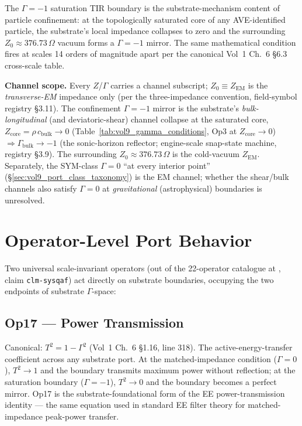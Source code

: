 The $\Gamma = -1$\gammaundeclared{} saturation TIR boundary is the substrate-mechanism content of particle confinement: at the topologically saturated core of any AVE-identified particle, the substrate's local impedance collapses to zero and the surrounding $Z_0 \approx 376.73\,\Omega$ vacuum forms a $\Gamma = -1$\gammaundeclared{} mirror. The same mathematical condition fires at scales 14 orders of magnitude apart per the canonical Vol~1 Ch.~6 \S 6.3 cross-scale table.

\noindent
\textbf{Channel scope.} Every $Z$/$\Gamma$ carries a channel subscript; $Z_0 \equiv Z_{\mathrm{EM}}$ is the \emph{transverse-EM} impedance only (per the three-impedance convention, field-symbol registry \S3.11). The confinement $\Gamma = -1$\gammaundeclared{} mirror is the substrate's \emph{bulk-longitudinal} (and deviatoric-shear) channel collapse at the saturated core, $Z_{\mathrm{core}} = \rho\,c_{\mathrm{bulk}} \to 0$ (Table~\ref{tab:vol9_gamma_conditions}, Op3 at $Z_{\mathrm{core}} \to 0$) $\Rightarrow \Gamma_{\mathrm{bulk}} \to -1$ (the sonic-horizon reflector; engine-scale snap-state machine, registry \S3.9). The surrounding $Z_0 \approx 376.73\,\Omega$ is the cold-vacuum $Z_{\mathrm{EM}}$. Separately, the SYM-class $\Gamma = 0$ ``at every interior point'' (\S\ref{sec:vol9_port_class_taxonomy}) is the EM channel; whether the shear/bulk channels also satisfy $\Gamma = 0$ at \emph{gravitational} (astrophysical) boundaries is unresolved.

\section{Operator-Level Port Behavior}
\label{sec:vol9_operator_port_behavior}

Two universal scale-invariant operators (out of the 22-operator catalogue at , claim \texttt{clm-sysqaf}) act directly on substrate boundaries, occupying the two endpoints of substrate $\Gamma$-space:

\subsection{Op17 --- Power Transmission}

Canonical: $T^2 = 1 - \Gamma^2$ (Vol~1 Ch.~6 \S 1.16, line 318). The active-energy-transfer coefficient across any substrate port. At the matched-impedance condition ($\Gamma = 0$), $T^2 \to 1$ and the boundary transmits maximum power without reflection; at the saturation boundary ($\Gamma = -1$\gammaundeclared{}), $T^2 \to 0$ and the boundary becomes a perfect mirror. Op17 is the substrate-foundational form of the EE power-transmission identity --- the same equation used in standard EE filter theory for matched-impedance peak-power transfer.

